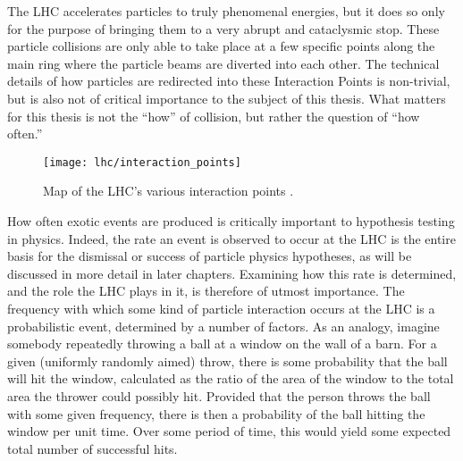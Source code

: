     The LHC accelerates particles to truly phenomenal energies, but it does so only for the purpose of bringing them to a very abrupt and cataclysmic stop.
    These particle collisions are only able to take place at a few specific points along the main ring where the particle beams are diverted into each other.
    The technical details of how particles are redirected into these Interaction Points is non-trivial, but is also not of critical importance to the subject of this thesis.
    What matters for this thesis is not the ``how'' of collision, but rather the question of ``how often.''

    \begin{figure}[h]
        \texttt{[image: lhc/interaction\_points]}
        \caption{Map of the LHC's various interaction points \cite{lhc_machine}.}
        \label{fig:interaction_points}
    \end{figure}

    \FloatBarrier

    How often exotic events are produced is critically important to hypothesis testing in physics.
    Indeed, the rate an event is observed to occur at the LHC is the entire basis for the dismissal or success of particle physics hypotheses,
        as will be discussed in more detail in later chapters.
    Examining how this rate is determined, and the role the LHC plays in it, is therefore of utmost importance.
    The frequency with which some kind of particle interaction occurs at the LHC is a probabilistic event, determined by a number of factors.
    As an analogy, imagine somebody repeatedly throwing a ball at a window on the wall of a barn.
    For a given (uniformly randomly aimed) throw, there is some probability that the ball will hit the window,
        calculated as the ratio of the area of the window to the total area the thrower could possibly hit.
    Provided that the person throws the ball with some given frequency, there is then a probability of the ball hitting the window per unit time.
    Over some period of time, this would yield some expected total number of successful hits.

    

